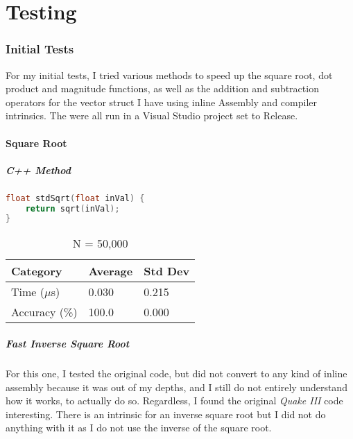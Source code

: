 \documentclass{article}
\begin{document}
\pagebreak[0]

\part{Testing}

\section{Initial Tests}

For my initial tests, I tried various methods to speed up the square root, dot product and magnitude functions, as well as the addition and subtraction operators for the vector struct I have using inline Assembly and compiler intrinsics. The were all run in a Visual Studio project set to Release.

\subsection{Square Root}

\subsubsection{C++ Method}

\begin{lstlisting}[language=C++]
float stdSqrt(float inVal) { 
	return sqrt(inVal); 
}
\end{lstlisting}

\vspace{3mm}

\begin{table}[ht!]
\centering
\begin{tabular}{l|l|l}
Category        &   Average &   Std Dev \\
\hline
Time ($\mu$s)    &   0.030   &   0.215   \\
Accuracy (\%)   &   100.0   &   0.000   \\
\end{tabular}
\caption{N = 50,000}
\end{table}

\vspace{5mm}

\subsubsection{Fast Inverse Square Root}

For this one, I tested the original code, but did not convert to any kind of inline assembly because it was out of my depths, and I still do not entirely understand how it works, to actually do so. Regardless, I found the original \textit{Quake III} code interesting. There is an intrinsic for an inverse square root but I did not do anything with it as I do not use the inverse of the square root.
\end{document}
